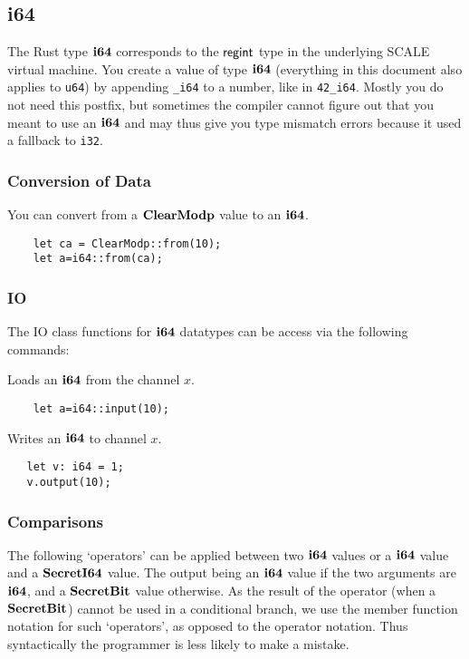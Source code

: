 \subsection{i64}
The Rust type $\mathbf{i64}$ corresponds to the $\mathsf{regint}$ type in the underlying SCALE virtual machine.
You create a value of type $\mathbf{i64}$ (everything in this document also applies to \verb|u64|)
by appending \verb|_i64| to a number, like in \verb|42_i64|. Mostly you
do not need this postfix, but sometimes the compiler cannot figure out that you meant to use an
$\mathbf{i64}$ and may thus give you type mismatch errors because it used a fallback to \verb|i32|.

\subsubsection{Conversion of Data}
You can convert from a $\mathbf{ClearModp}$ value to an $\mathbf{i64}$.
\begin{lstlisting}
    let ca = ClearModp::from(10);
    let a=i64::from(ca);
\end{lstlisting}

\subsubsection{IO}
The IO class functions for $\mathbf{i64}$ datatypes can be access via the following commands:

Loads an $\mathbf{i64}$ from the channel $x$.
\begin{lstlisting}
    let a=i64::input(10);
\end{lstlisting}

Writes an $\mathbf{i64}$ to channel $x$.
\begin{lstlisting}
   let v: i64 = 1;
   v.output(10);
\end{lstlisting}

\subsubsection{Comparisons}
The following `operators' can be applied between two $\mathbf{i64}$ values
or a $\mathbf{i64}$ value and a $\mathbf{SecretI64}$ value. The output being an $\mathbf{i64}$
value if the two arguments are $\mathbf{i64}$, and a $\mathbf{SecretBit}$ value otherwise.
As the result of the operator (when a $\mathbf{SecretBit}$) cannot be used in a
conditional branch, we use the member function notation for such `operators', as opposed
to the operator notation. Thus syntactically the programmer is less
likely to make a mistake.

